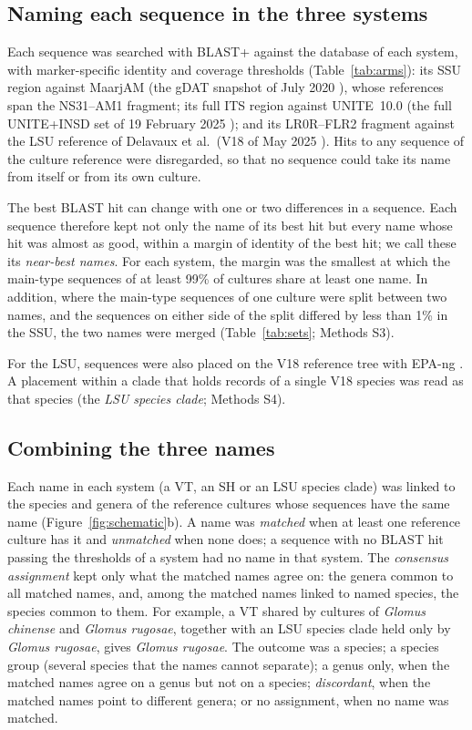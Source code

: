 \documentclass[11pt]{article}
\newcommand{\spn}[1]{\emph{#1}}   %
\begin{document}
\subsection{Naming each sequence in the three systems}\label{sec:naming}
Each sequence was searched with BLAST+ \cite{camacho2009blast} against the database of each system, with
marker-specific identity and coverage thresholds (Table~\ref{tab:arms}): its SSU region against MaarjAM (the gDAT
snapshot of July 2020 \cite{opik2010maarjam}), whose references span the NS31--AM1 fragment; its full ITS region
against UNITE~10.0 (the full UNITE+INSD set of 19 February 2025 \cite{nilsson2019unite,unite2025release}); and its
LR0R--FLR2 fragment against the LSU reference of Delavaux et al.\ (V18 of May 2025
\cite{delavaux2021lsu,delavaux2022lsu,delavaux2024lsu}). Hits to any sequence of the culture reference were
disregarded, so that no sequence could take its name from itself or from its own culture.

The best BLAST hit can change with one or two differences in a sequence. Each sequence therefore kept not only the
name of its best hit but every name whose hit was almost as good, within a margin of identity of the best hit; we
call these its \emph{near-best names}. For each system, the margin was the smallest at which the main-type sequences
of at least 99\% of cultures share at least one name. In addition, where the main-type sequences of one culture were
split between two names, and the sequences on either side of the split differed by less than 1\% in the SSU, the
two names were merged (Table~\ref{tab:sets}; Methods S3).

For the LSU, sequences were also placed on the V18 reference tree with EPA-ng \cite{barbera2019epang}. A placement
within a clade that holds records of a single V18 species was read as that species (the \emph{LSU species clade};
Methods S4).



\subsection{Combining the three names}\label{sec:combining}
Each name in each system (a VT, an SH or an LSU species clade) was linked to the species and genera of the
reference cultures whose sequences have the same name (Figure~\ref{fig:schematic}b). A name was \emph{matched} when
at least one reference culture has it and \emph{unmatched} when none does; a sequence with no BLAST hit passing the
thresholds of a system had no name in that system. The \emph{consensus assignment} kept only what the matched names
agree on: the genera common to all matched names, and, among the matched names linked to named species, the species
common to them. For example, a VT shared by cultures of \spn{Glomus chinense} and \spn{Glomus rugosae}, together with
an LSU species clade held only by \spn{Glomus rugosae}, gives \spn{Glomus rugosae}. The outcome was a species; a
species group (several species that the names cannot separate); a genus only, when the matched names agree on a
genus but not on a species; \emph{discordant}, when the matched names point to different genera; or no assignment,
when no name was matched.
\end{document}
